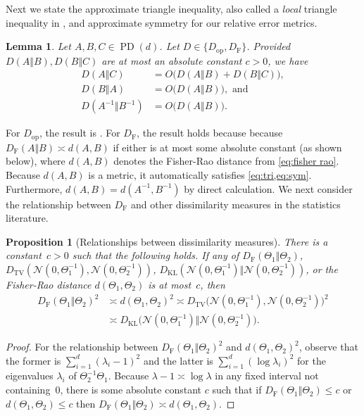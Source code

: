 \documentclass[aos]{imsart}
\newtheorem{prop}[theorem]{Proposition}
\newtheorem{lemma}[theorem]{Lemma}
\theoremstyle{definition}
\numberwithin{equation}{section}
\DeclareMathOperator{\PD}{PD}
\newcommand{\DF}{D_{\operatorname{F}}}
\newcommand{\Dop}{D_{\operatorname{op}}}
\newcommand{\DKL}{D_{\operatorname{KL}}}
\newcommand{\DTV}{D_{\operatorname{TV}}}
\begin{document}
\begin{appendix}
Next we state the approximate triangle inequality, also called a \emph{local} triangle inequality in \cite{yang1999information}, and approximate symmetry for our relative error metrics.

\begin{lemma}\label{lem:triangle-ineq}
Let $A, B, C \in \PD(d)$.
Let $D \in \{\Dop, \DF\}$. Provided $D(A\Vert B), D(B\Vert C)$ are at most an absolute constant $c>0$, we have
\begin{align}
  D(A\Vert C) &= O\bigl( D(A\Vert B) + D(B\Vert C) \bigr),\label{eq:tri}\\
  D(B\Vert A) &= O\bigl( D(A\Vert B) \bigr),\label{eq:sym} \text{ and }\\
  D(A^{-1}\Vert B^{-1}) &= O\bigl( D(A\Vert B) \bigr).
\end{align}
\end{lemma}

For $\Dop$, the result is \cite[Lemma~C.1]{FM20}.
For $\DF$, the result holds because because $\DF(A\Vert  B) \asymp d(A, B)$ if either is at most some absolute constant (as shown below), where $d(A, B)$ denotes the Fisher-Rao distance from \cref{eq:fisher rao}.
Because $d(A, B)$ is a metric, it automatically satisfies \cref{eq:tri,eq:sym}. Furthermore, $d(A,B) = d(A^{-1}, B^{-1})$ by direct calculation.
We next consider the relationship between $\DF$ and other dissimilarity measures in the statistics literature.

\begin{prop}[Relationships between dissimilarity measures]\label{prop:dissimilarities}
There is a constant~$c > 0$ such that the following holds.
If any of
$\DF(\Theta_1\Vert  \Theta_2)$,
$\DTV(\mathcal{N}(0, \Theta_1^{-1}), \mathcal{N}(0, \Theta_2^{-1}))$,
$\DKL(\mathcal{N}(0, \Theta_1^{-1}) \Vert  \mathcal{N}(0, \Theta_2^{-1}))$,
or the Fisher-Rao distance $d(\Theta_1, \Theta_2)$
is at most~$c$, then
\begin{align*}
  \DF(\Theta_1\Vert  \Theta_2)^2
&\asymp d(\Theta_1, \Theta_2)^2
\asymp \DTV\bigl(\mathcal{N}(0, \Theta_1^{-1}), \mathcal{N}(0, \Theta_2^{-1})\bigr)^2 \\
&\asymp \DKL\bigl(\mathcal{N}(0, \Theta_1^{-1}) \Vert  \mathcal{N}(0, \Theta_2^{-1})\bigr).
\end{align*}
\end{prop}
\begin{proof}
For the relationship between $\DF(\Theta_1\Vert  \Theta_2)^2$ and $d(\Theta_1, \Theta_2)^2$, observe that the former is $\sum_{i = 1}^d (\lambda_i - 1)^2$ and the latter is $\sum_{i = 1}^d (\log \lambda_i)^2$ for the eigenvalues $\lambda_i$ of $\Theta_2^{-1} \Theta_1$. Because $\lambda-1 \asymp \log \lambda$ in any fixed interval not containing~$0$, there is some absolute constant $c$ such that if $\DF(\Theta_1 \Vert  \Theta_2) \leq c$ or $d(\Theta_1, \Theta_2) \leq c$ then $\DF(\Theta_1 \Vert  \Theta_2) \asymp d(\Theta_1, \Theta_2)$.


\end{proof}
\end{appendix}
\end{document}
